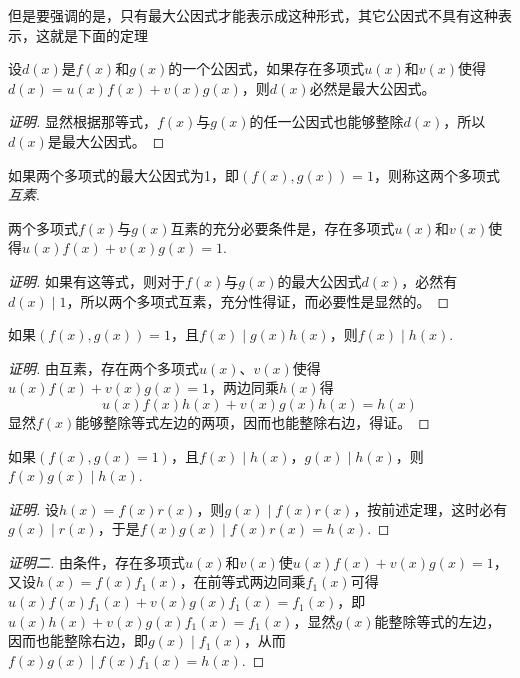 但是要强调的是，只有最大公因式才能表示成这种形式，其它公因式不具有这种表示，这就是下面的定理
\begin{theorem}
  设$d(x)$是$f(x)$和$g(x)$的一个公因式，如果存在多项式$u(x)$和$v(x)$使得$d(x)=u(x)f(x)+v(x)g(x)$，则$d(x)$必然是最大公因式。
\end{theorem}

\begin{proof}[证明]
  显然根据那等式，$f(x)$与$g(x)$的任一公因式也能够整除$d(x)$，所以$d(x)$是最大公因式。
\end{proof}

\begin{definition}
  如果两个多项式的最大公因式为1，即$(f(x),g(x))=1$，则称这两个多项式 \emph{互素}.
\end{definition}

\begin{theorem}
  两个多项式$f(x)$与$g(x)$互素的充分必要条件是，存在多项式$u(x)$和$v(x)$使得$u(x)f(x)+v(x)g(x)=1$.
\end{theorem}

\begin{proof}[证明]
  如果有这等式，则对于$f(x)$与$g(x)$的最大公因式$d(x)$，必然有$d(x) \mid 1$，所以两个多项式互素，充分性得证，而必要性是显然的。
\end{proof}

\begin{theorem}
  如果$(f(x),g(x))=1$，且$f(x) \mid g(x)h(x)$，则$f(x) \mid h(x)$.
\end{theorem}

\begin{proof}[证明]
  由互素，存在两个多项式$u(x)$、$v(x)$使得$u(x)f(x)+v(x)g(x)=1$，两边同乘$h(x)$得
  \[ u(x)f(x)h(x) + v(x)g(x)h(x) = h(x) \]
  显然$f(x)$能够整除等式左边的两项，因而也能整除右边，得证。
\end{proof}

\begin{inference}
  如果$(f(x),g(x)=1)$，且$f(x) \mid h(x)$，$g(x) \mid h(x)$，则$f(x)g(x) \mid h(x)$.
\end{inference}

\begin{proof}[证明]
  设$h(x)=f(x)r(x)$，则$g(x) \mid f(x)r(x)$，按前述定理，这时必有$g(x) \mid r(x)$，于是$f(x)g(x) \mid f(x)r(x) = h(x)$.
\end{proof}

\begin{proof}[证明二]
  由条件，存在多项式$u(x)$和$v(x)$使$u(x)f(x)+v(x)g(x)=1$，又设$h(x)=f(x)f_1(x)$，在前等式两边同乘$f_1(x)$可得$u(x)f(x)f_1(x)+v(x)g(x)f_1(x)=f_1(x)$，即$u(x)h(x)+v(x)g(x)f_1(x)=f_1(x)$，显然$g(x)$能整除等式的左边，因而也能整除右边，即$g(x) \mid f_1(x)$，从而$f(x)g(x) \mid f(x)f_1(x) = h(x)$.
\end{proof}

